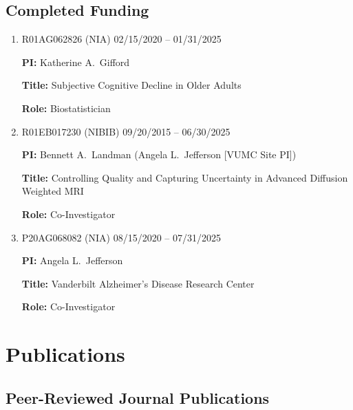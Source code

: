 \documentclass[12pt,letterpaper]{article}
\newenvironment{cventry}{\begin{minipage}[t]{\linewidth}}{\end{minipage}}
\begin{document}
	\subsection*{Completed Funding}
	\begin{enumerate}		
		\item\begin{cventry} R01AG062826 (NIA) \hfill 02/15/2020 -- 01/31/2025
		
		{\bf PI:} Katherine A.\ Gifford
		
		{\bf Title:} Subjective Cognitive Decline in Older Adults
		
		{\bf Role:} Biostatistician
		\par\end{cventry}
		\item\begin{cventry} R01EB017230 (NIBIB) \hfill 09/20/2015 -- 06/30/2025
		
		{\bf PI:} Bennett A.\ Landman (Angela L.\ Jefferson [VUMC 
		Site PI])
		
		{\bf Title:} Controlling Quality and Capturing Uncertainty 
		in Advanced Diffusion Weighted MRI
		
		{\bf Role:} Co-Investigator
		\par\end{cventry}
		\item\begin{cventry} P20AG068082 (NIA) \hfill 08/15/2020 -- 
		07/31/2025
		
		{\bf PI:} Angela L.\ Jefferson
		
		{\bf Title:} Vanderbilt Alzheimer's Disease Research Center
		
		{\bf Role:} Co-Investigator
		\par\end{cventry}
	\end{enumerate}

	
	\section*{Publications}
	\subsection*{Peer-Reviewed Journal Publications}
	
\end{document}
